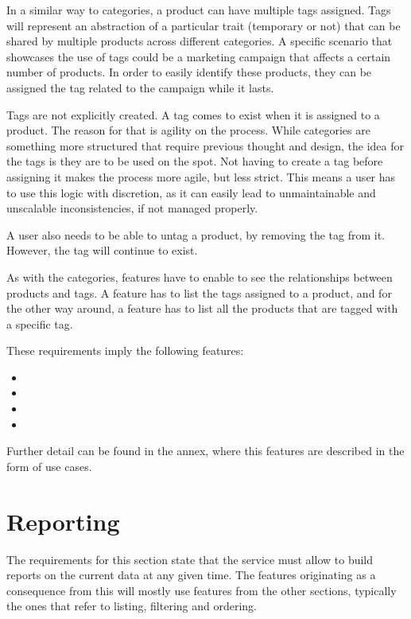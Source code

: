 In a similar way to categories, a product can have multiple tags assigned. Tags will represent an abstraction of a particular trait (temporary or not) that can be shared by multiple products across different categories. A specific scenario that showcases the use of tags could be a marketing campaign that affects a certain number of products. In order to easily identify these products, they can be assigned the tag related to the campaign while it lasts.

Tags are not explicitly created. A tag comes to exist when it is assigned to a product. The reason for that is agility on the process. While categories are something more structured that require previous thought and design, the idea for the tags is they are to be used on the spot. Not having to create a tag before assigning it makes the process more agile, but less strict. This means a user has to use this logic with discretion, as it can easily lead to unmaintainable and unscalable inconsistencies, if not managed properly.

A user also needs to be able to untag a product, by removing the tag from it. However, the tag will continue to exist.

As with the categories, features have to enable to see the relationships between products and tags. A feature has to list the tags assigned to a product, and for the other way around, a feature has to list all the products that are tagged with a specific tag.

These requirements imply the following features:

\begin{itemize}
\item {}
\item {}
\item {}
\item {}
\end{itemize}

Further detail can be found in the annex, where this features are described in the form of use cases.

\section{Reporting}
The requirements for this section state that the service must allow to build reports on the current data at any given time. The features originating as a consequence from this will mostly use features from the other sections, typically the ones that refer to listing, filtering and ordering.

